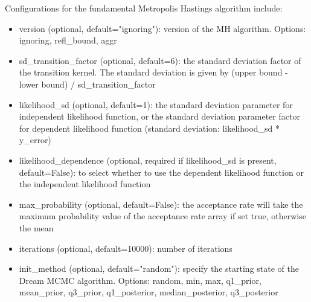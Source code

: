 Configurations for the fundamental Metropolis Hastings algorithm include:
\begin{itemize}
    \item version (optional, default="ignoring"): version of the MH algorithm. Options: ignoring, refl\_bound, aggr
    \item sd\_transition\_factor (optional, default=6): the standard deviation factor of the transition kernel. The standard deviation is given by (upper bound - lower bound) / sd\_transition\_factor
    \item likelihood\_sd (optional, default=1): the standard deviation parameter for independent likelihood function, or the standard deviation parameter factor for dependent likelihood function (standard deviation: likelihood\_sd * y\_error)
    \item likelihood\_dependence (optional, required if likelihood\_sd is present, default=False): to select whether to use the dependent likelihood function or the independent likelihood function
    \item max\_probability (optional, default=False): the acceptance rate will take the maximum probability value of the acceptance rate array if set true, otherwise the mean
    \item iterations (optional, default=10000): number of iterations
    \item init\_method (optional, default="random"): specify the starting state of the Dream MCMC algorithm. Options: random, min, max, q1\_prior, mean\_prior, q3\_prior, q1\_posterior, median\_posterior, q3\_posterior
\end{itemize}


